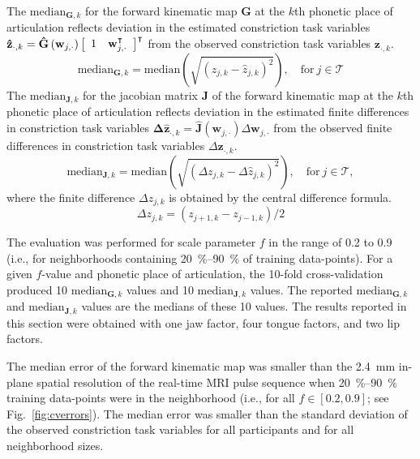 \documentclass[preprint]{JASAnew}\usepackage[]{graphicx}\usepackage[]{color}
\begin{document}
The $\mathrm{median}_{\mathbf{G},k}$ for the forward kinematic map $\mathbf{G}$ at the $k$th phonetic place of articulation reflects deviation in the estimated constriction task variables $\mathbf{\hat{z}}_{\cdot,k} = \mathbf{\hat{G}}\left( \mathbf{w}_{j,\cdot} \right) \left[ \begin{array}{c c} 1 & \mathbf{w}_{j,\cdot}^\intercal \end{array} \right]^\intercal$ from the observed constriction task variables $\mathbf{z}_{\cdot,k}$.
%
\begin{equation}
\mathrm{median}_{\mathbf{G},k} = \mathrm{median} \left( \sqrt{ \left( z_{j,k} - \hat{z}_{j,k} \right)^2 } \right), \quad \text{for}~j\in\mathcal{T} 
\end{equation}
The $\mathrm{median}_{\mathbf{J},k}$ for the jacobian matrix $\mathbf{J}$ of the forward kinematic map at the $k$th phonetic place of articulation reflects deviation in the estimated finite differences in constriction task variables $\mathbf{\Delta \hat{z}}_{\cdot,k} = \mathbf{\hat{J}}\left( \mathbf{w}_{j,\cdot} \right) \Delta \mathbf{w}_{j,\cdot}$ from the observed finite differences in constriction task variables $\Delta \mathbf{z}_{\cdot,k}$.
%
\begin{equation}
\mathrm{median}_{\mathbf{J},k} = \mathrm{median} \left( \sqrt{ \left( \Delta z_{j,k} - \Delta \hat{z}_{j,k} \right)^2 } \right), \quad \text{for}~j\in\mathcal{T},
\end{equation}
%
where the finite difference $\Delta z_{j,k}$ is obtained by the central difference formula.
%
\begin{equation}
\Delta z_{j,k} = \left( z_{j+1,k} - z_{j-1,k} \right) / 2
\end{equation}


The evaluation was performed for scale parameter $f$ in the range of \num{0.2} to \num{0.9} (i.e., for neighborhoods containing \SIrange{20}{90}{\percent} of training data-points).
%
For a given $f$-value and phonetic place of articulation, the 10-fold cross-validation produced \num{10} $\mathrm{median}_{\mathbf{G},k}$ values and \num{10} $\mathrm{median}_{\mathbf{J},k}$ values.
%
The reported $\mathrm{median}_{\mathbf{G},k}$ and $\mathrm{median}_{\mathbf{J},k}$ values are the medians of these \num{10} values.
%
The results reported in this section were obtained with one jaw factor, four tongue factors, and two lip factors.



The median error of the forward kinematic map was smaller than the \SI{2.4}{\milli\meter} in-plane spatial resolution of the real-time MRI pulse sequence when \SIrange{20}{90}{\percent} training data-points were in the neighborhood (i.e., for all $f\in \left[ 0.2, 0.9\right]$; see Fig.~\ref{fig:cverrors}). The median error was smaller than the standard deviation of the observed constriction task variables for all participants and for all neighborhood sizes.
\end{document}
